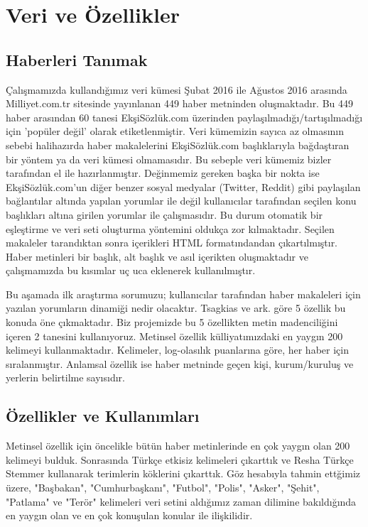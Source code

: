 \documentclass[conference]{IEEEtran}
\begin{document}
\section{Veri ve Özellikler}
\subsection{Haberleri Tanımak}
Çalışmamızda kullandığımız veri kümesi Şubat 2016 ile Ağustos 2016 arasında Milliyet.com.tr sitesinde yayınlanan 449 haber metninden oluşmaktadır. Bu 449 haber arasından 60 tanesi EkşiSözlük.com üzerinden paylaşılmadığı/tartışılmadığı için 'popüler değil' olarak etiketlenmiştir. Veri kümemizin sayıca az olmasının sebebi halihazırda haber makalelerini EkşiSözlük.com başlıklarıyla bağdaştıran bir yöntem ya da veri kümesi olmamasıdır. Bu sebeple veri kümemiz bizler tarafından el ile hazırlanmıştır. Değinmemiz gereken başka bir nokta ise EkşiSözlük.com'un diğer benzer sosyal medyalar (Twitter, Reddit) gibi paylaşılan bağlantılar altında yapılan yorumlar ile değil kullanıcılar tarafından seçilen konu başlıkları altına girilen yorumlar ile çalışmasıdır. Bu durum otomatik bir eşleştirme ve veri seti oluşturma yöntemini oldukça zor kılmaktadır. Seçilen makaleler tarandıktan sonra içerikleri HTML formatındandan çıkartılmıştır. Haber metinleri bir başlık, alt başlık ve asıl içerikten oluşmaktadır ve çalışmamızda bu kısımlar uç uca eklenerek kullanılmıştır.

Bu aşamada ilk araştırma sorumuzu; kullanıcılar tarafından haber makaleleri için yazılan yorumların dinamiği nedir olacaktır. Tsagkias ve ark. \cite{tsagkias_predicting_2009} göre 5 özellik bu konuda öne çıkmaktadır. Biz projemizde bu 5 özellikten metin madenciliğini içeren 2 tanesini kullanıyoruz. Metinsel özellik külliyatımızdaki en yaygın 200 kelimeyi kullanmaktadır. Kelimeler, log-olasılık puanlarına göre, her haber için sıralanmıştır. Anlamsal özellik ise haber metninde geçen kişi, kurum/kuruluş ve yerlerin belirtilme sayısıdır.

\subsection{Özellikler ve Kullanımları}
Metinsel özellik için öncelikle bütün haber metinlerinde en çok yaygın olan 200 kelimeyi bulduk. Sonrasında Türkçe etkisiz kelimeleri çıkarttık ve Resha Türkçe Stemmer \cite{resha-turkish-stemmer} kullanarak terimlerin köklerini çıkarttık. Göz hesabıyla tahmin ettğimiz üzere, "Başbakan", "Cumhurbaşkanı", "Futbol", "Polis", "Asker", "Şehit", "Patlama" ve "Terör" kelimeleri veri setini aldığımız zaman dilimine bakıldığında en yaygın olan ve en çok konuşulan konular ile ilişkilidir.
\end{document}
